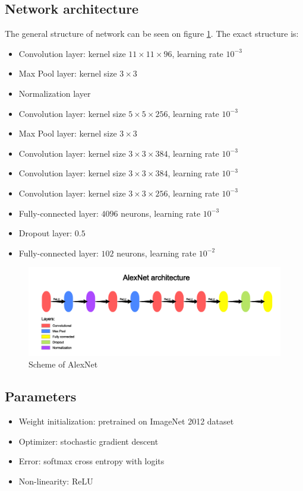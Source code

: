 \documentclass[licencjacka]{pracamgr}
\begin{document}
 		\subsection{Network architecture}
 		The general structure of network can be seen on figure \ref{fig:45}. The exact structure is:
 			\begin{itemize}
 			\item Convolution layer: kernel size $11 \times 11 \times 96$, learning rate $10^{-3}$
 			\item Max Pool layer: kernel size $3 \times 3$
 			\item Normalization layer
 			\item Convolution layer: kernel size $5 \times 5 \times 256$, learning rate $10^{-3}$
 			\item Max Pool layer: kernel size $3 \times 3$
 			\item Convolution layer: kernel size $3 \times 3 \times 384$, learning rate $10^{-3}$
 			\item Convolution layer: kernel size $3 \times 3 \times 384$, learning rate $10^{-3}$
 			\item Convolution layer: kernel size $3 \times 3 \times 256$, learning rate $10^{-3}$
 			\item Fully-connected layer: $4096$ neurons, learning rate $10^{-3}$
 			\item Dropout layer: $0.5$
 			\item Fully-connected layer: $102$ neurons, learning rate $10^{-2}$
 			\end{itemize}
 			\begin{figure}[h]
				\caption{Scheme of AlexNet}
				\label{fig:45}
				\centering
				\includegraphics[width=\textwidth]{AlexNet}
			\end{figure}
 		\subsection{Parameters}
 			\begin{itemize}
 			\item Weight initialization: pretrained on ImageNet 2012 dataset
 			\item Optimizer: stochastic gradient descent
 			\item Error: softmax cross entropy with logits
 			\item Non-linearity: ReLU
			\end{itemize}
\end{document}
